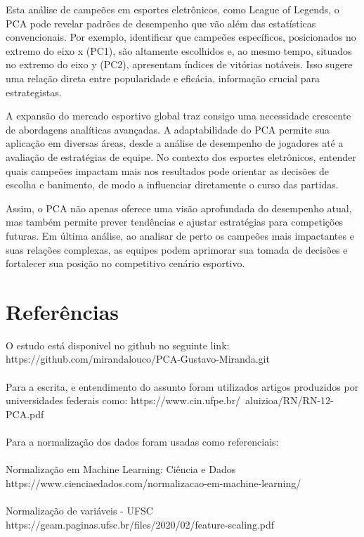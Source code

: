 \documentclass[a4paper,12pt]{article}
\begin{document}
Esta análise de campeões em esportes eletrônicos, como League of Legends, o PCA pode revelar padrões de desempenho que vão além das estatísticas convencionais. Por exemplo, identificar que campeões específicos, posicionados no extremo do eixo x (PC1), são altamente escolhidos e, ao mesmo tempo, situados no extremo do eixo y (PC2), apresentam índices de vitórias notáveis. Isso sugere uma relação direta entre popularidade e eficácia, informação crucial para estrategistas.

A expansão do mercado esportivo global traz consigo uma necessidade crescente de abordagens analíticas avançadas. A adaptabilidade do PCA permite sua aplicação em diversas áreas, desde a análise de desempenho de jogadores até a avaliação de estratégias de equipe. No contexto dos esportes eletrônicos, entender quais campeões impactam mais nos resultados pode orientar as decisões de escolha e banimento, de modo a influenciar diretamente o curso das partidas.

Assim, o PCA não apenas oferece uma visão aprofundada do desempenho atual, mas também permite prever tendências e ajustar estratégias para competições futuras. Em última análise, ao analisar de perto os campeões mais impactantes e suas relações complexas, as equipes podem aprimorar sua tomada de decisões e fortalecer sua posição no competitivo cenário esportivo.

\section*{Referências}
O estudo está disponivel no github no seguinte link: https://github.com/mirandalouco/PCA-Gustavo-Miranda.git\\\\
Para a escrita, e entendimento do assunto foram utilizados artigos produzidos por universidades federais como: https://www.cin.ufpe.br/~aluizioa/RN/RN-12-PCA.pdf\\\\
Para a normalização dos dados foram usadas como referenciais:\\\\
Normalização em Machine Learning: Ciência e Dados https://www.cienciaedados.com/normalizacao-em-machine-learning/ \\\\
Normalização de variáveis - UFSC https://geam.paginas.ufsc.br/files/2020/02/feature-scaling.pdf
\end{document}
